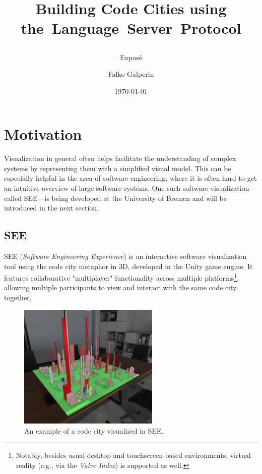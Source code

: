 \documentclass{scrartcl}
\newif\ifdraft
\newcommand{\SEE}{\textsc{SEE}}
\begin{document}
\title{
  Building Code Cities using \mbox{the Language Server Protocol}
  \ifdraft
    -- \emph{DRAFT} --
  \fi
}
\subtitle{Exposé}
\author{Falko Galperin}
\date{\today} 

\maketitle

\begingroup
  \tableofcontents
\endgroup
\newpage

\section{Motivation}
Visualization in general often helps facilitate the understanding of complex systems by representing them with a simplified visual model.
This can be especially helpful in the area of software engineering, where it is often hard to get an intuitive overview of large software systems.
One such software visualization---called \SEE{}---is being developed at the University of Bremen and will be introduced in the next section.


\subsection{SEE}
\SEE{} (\emph{Software Engineering Experience}) is an interactive software visualization tool using the code city metaphor in 3D, developed in the {Unity} game engine.
It features collaborative "multiplayer" functionality across multiple platforms\footnote{
  Notably, besides usual desktop and touchscreen-based environments, virtual reality (e.g., via the \emph{Valve Index}) is supported as well.
}, allowing multiple participants to view and interact with the same code city together.

\begin{figure}
    \centering
    \includegraphics[width=0.6\textwidth]{figures/SEE_city}
    \caption{An example of a code city visualized in \SEE{}.}\label{fig:city}
\end{figure}
\end{document}
